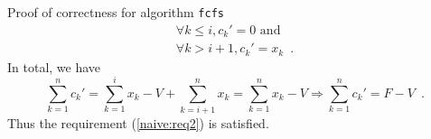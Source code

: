 \begin{sepproof}{Proof of correctness for algorithm \texttt{fcfs}}
\begin{equation*}
\begin{gathered}
    \forall k \leq i, c_k' = 0 \mbox{ and} \\
    \forall k > i+1, c_k' = x_k \enspace.
  \end{gathered}
  \end{equation*}
  In total, we have
  \begin{equation*}
    \sum\limits_{k=1}^{n}c_k' = \sum\limits_{k=1}^{i}x_k - V + \sum\limits_{k=i+1}^{n}x_k =
  \sum\limits_{k=1}^{n}x_k - V \Rightarrow \sum\limits_{k=1}^{n}c_k' = F - V \enspace.
  \end{equation*}
  Thus the requirement (\ref{naive:req2}) is satisfied.
\end{sepproof}
